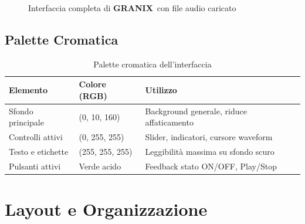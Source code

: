 \documentclass[a4paper,11pt,openany]{book}
\newcommand{\granix}{\textbf{\textcolor{granixblue}{GRANIX}}}
\begin{document}
\begin{figure}[H]
    \centering
    \caption{Interfaccia completa di \granix\ con file audio caricato}
    \label{fig:interface_complete}
\end{figure}

\subsection{Palette Cromatica}

\begin{table}[H]
    \centering
    \caption{Palette cromatica dell'interfaccia}
    \label{tab:color_palette}
    \begin{tabular}{@{}llp{5cm}@{}}
        \toprule
        \textbf{Elemento} & \textbf{Colore (RGB)} & \textbf{Utilizzo} \\
        \midrule
        Sfondo principale & (0, 10, 160) & Background generale, riduce affaticamento \\
        Controlli attivi & (0, 255, 255) & Slider, indicatori, cursore waveform \\
        Testo e etichette & (255, 255, 255) & Leggibilità massima su sfondo scuro \\
        Pulsanti attivi & Verde acido & Feedback stato ON/OFF, Play/Stop \\
        \bottomrule
    \end{tabular}
\end{table}

\section{Layout e Organizzazione}
\end{document}

